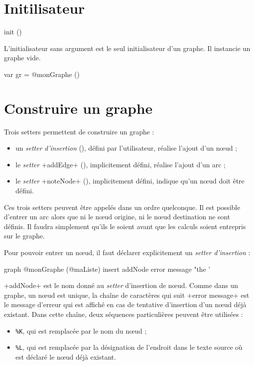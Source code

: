 \section{Initilisateur}

\begin{galgas34}
init ()
\end{galgas34}

L'initialisateur sans argument est le seul initialisateur d'un graphe. Il instancie un graphe vide.

\begin{galgas34}
var gr = @monGraphe ()
\end{galgas34}



\section{Construire un graphe}

Trois setters permettent de construire un graphe :
\begin{itemize}
  \item un \emph{setter d'insertion} (), défini par l'utilisateur, réalise l'ajout d'un nœud ;
  \item le \emph{setter} \ggst+addEdge+ (), implicitement défini, réalise l'ajout d'un arc ;
  \item le \emph{setter} \ggst+noteNode+ (), implicitement défini, indique qu'un nœud doit être défini.
\end{itemize}

Ces trois setters peuvent être appelés dans un ordre quelconque. Il est possible d'entrer un arc alors que ni le nœud origine, ni le nœud destination ne sont définis. Il faudra simplement qu'ils le soient avant que les calculs soient entrepris sur le graphe.


Pour pouvoir entrer un nœud, il faut déclarer explicitement un \emph{setter d'insertion} :
\begin{galgas3}
graph @monGraphe (@maListe) {
  insert addNode error message "the '%
}
\end{galgas3}

\ggst+addNode+ est le nom donné au \emph{setter} d'insertion de nœud. Comme dans un graphe, un nœud est unique, la chaîne de caractères qui suit \ggst+error message+ est le message d'erreur qui est affiché en cas de tentative d'insertion d'un nœud déjà existant. Dans cette chaîne, deux séquences particulières peuvent être utilisées :
\begin{itemize}
  \item \texttt{\%K}, qui est remplacée par le nom du nœud ;
  \item \texttt{\%L}, qui est remplacée par la désignation de l'endroit dans le texte source où est déclaré le nœud déjà existant.
\end{itemize}

